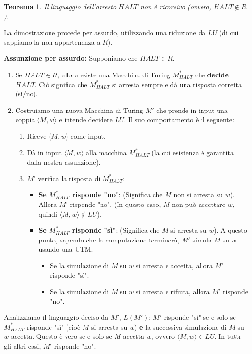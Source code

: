 \documentclass[a4paper]{article}
\makeatletter
\newtheorem{theorem}{Teorema}[section] %
\renewenvironment{proof}[1][\proofname]{\par
  \pushQED{\qed}%
  \normalfont \topsep6\p@\@plus6\p@\relax
  \trivlist
  \item[\hskip\labelsep
        \bfseries
    #1\@addpunct{.}]\ignorespaces
}{%
  \popQED\endtrivlist\@endpefalse
}
\makeatother
\begin{document}
\begin{theorem}
Il linguaggio dell'arresto $HALT$ non è ricorsivo (ovvero, $HALT \notin R$).
\end{theorem}
\begin{proof}
La dimostrazione procede per assurdo, utilizzando una riduzione da $LU$ (di cui sappiamo la non appartenenza a $R$).

\textbf{Assunzione per assurdo:} Supponiamo che $HALT \in R$.
\begin{enumerate}
    \item Se $HALT \in R$, allora esiste una Macchina di Turing $M_{HALT}^*$ che \textbf{decide} $HALT$. Ciò significa che $M_{HALT}^*$ si arresta sempre e dà una risposta corretta (sì/no).
    \item Costruiamo una nuova Macchina di Turing $M'$ che prende in input una coppia $\langle M, w \rangle$ e intende decidere $LU$. Il suo comportamento è il seguente:
    \begin{enumerate}
        \item Riceve $\langle M, w \rangle$ come input.
        \item Dà in input $\langle M, w \rangle$ alla macchina $M_{HALT}^*$ (la cui esistenza è garantita dalla nostra assunzione).
        \item $M'$ verifica la risposta di $M_{HALT}^*$:
        \begin{itemize}
            \item \textbf{Se $M_{HALT}^*$ risponde "no"}: (Significa che $M$ non si arresta su $w$). Allora $M'$ risponde "no". (In questo caso, $M$ non può accettare $w$, quindi $\langle M, w \rangle \notin LU$).
            \item \textbf{Se $M_{HALT}^*$ risponde "sì"}: (Significa che $M$ si arresta su $w$). A questo punto, sapendo che la computazione terminerà, $M'$ simula $M$ su $w$ usando una UTM.
            \begin{itemize}
                \item Se la simulazione di $M$ su $w$ si arresta e accetta, allora $M'$ risponde "sì".
                \item Se la simulazione di $M$ su $w$ si arresta e rifiuta, allora $M'$ risponde "no".
            \end{itemize}
        \end{itemize}
    \end{enumerate}
\end{enumerate}
Analizziamo il linguaggio deciso da $M'$, $L(M')$:
$M'$ risponde "sì" se e solo se $M_{HALT}^*$ risponde "sì" (cioè $M$ si arresta su $w$) \textbf{e} la successiva simulazione di $M$ su $w$ accetta. Questo è vero se e solo se $M$ accetta $w$, ovvero $\langle M, w \rangle \in LU$. In tutti gli altri casi, $M'$ risponde "no".


\end{proof}
\end{document}
